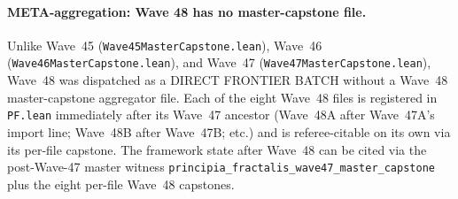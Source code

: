 \paragraph{META-aggregation: Wave 48 has no master-capstone file.}
Unlike Wave~45 (\texttt{Wave45MasterCapstone.lean}), Wave~46
(\texttt{Wave46MasterCapstone.lean}), and Wave~47
(\texttt{Wave47MasterCapstone.lean}), Wave~48 was dispatched as a
DIRECT FRONTIER BATCH without a Wave~48 master-capstone
aggregator file. Each of the eight Wave~48 files is registered in
\texttt{PF.lean} immediately after its Wave~47 ancestor (Wave~48A
after Wave~47A's import line; Wave~48B after Wave~47B; etc.) and is
referee-citable on its own via its per-file capstone. The framework
state after Wave~48 can be cited via the post-Wave-47 master
witness \texttt{principia\_fractalis\_wave47\_master\_capstone}
plus the eight per-file Wave~48 capstones.

